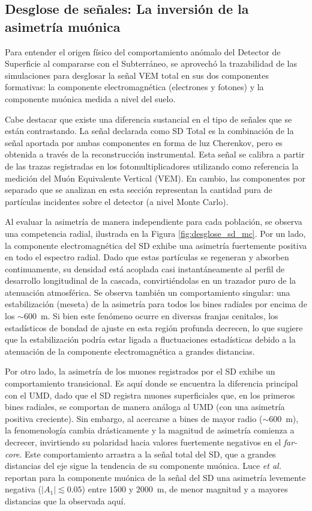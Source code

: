 \subsection{Desglose de señales: La inversión de la asimetría muónica}
\label{subsubsec:desglose_sd}

Para entender el origen físico del comportamiento anómalo del Detector de Superficie al compararse con el Subterráneo, se aprovechó la trazabilidad de las simulaciones para desglosar la señal VEM total en sus dos componentes formativas: la componente electromagnética (electrones y fotones) y la componente muónica medida a nivel del suelo. 

Cabe destacar que existe una diferencia sustancial en el tipo de señales que se están contrastando. La señal declarada como SD Total es la combinación de la señal aportada por ambas componentes en forma de luz Cherenkov, pero es obtenida a través de la reconstrucción instrumental. Esta señal se calibra a partir de las trazas registradas en los fotomultiplicadores utilizando como referencia la medición del Muón Equivalente Vertical (VEM). En cambio, las componentes por separado que se analizan en esta sección representan la cantidad pura de partículas incidentes sobre el detector (a nivel Monte Carlo). 

Al evaluar la asimetría de manera independiente para cada población, se observa una competencia radial, ilustrada en la Figura \ref{fig:desglose_sd_mc}. Por un lado, la componente electromagnética del SD exhibe una asimetría fuertemente positiva en todo el espectro radial. Dado que estas partículas se regeneran y absorben continuamente, su densidad está acoplada casi instantáneamente al perfil de desarrollo longitudinal de la cascada, convirtiéndolas en un trazador puro de la atenuación atmosférica. Se observa también un comportamiento singular: una estabilización (meseta) de la asimetría para todos los bines radiales por encima de los $\sim 600$~m. Si bien este fenómeno ocurre en diversas franjas cenitales, los estadísticos de bondad de ajuste en esta región profunda decrecen, lo que sugiere que la estabilización podría estar ligada a fluctuaciones estadísticas debido a la atenuación de la componente electromagnética a grandes distancias.

Por otro lado, la asimetría de los muones registrados por el SD exhibe un comportamiento transicional. Es aquí donde se encuentra la diferencia principal con el UMD, dado que el SD registra muones superficiales que, en los primeros bines radiales, se comportan de manera análoga al UMD (con una asimetría positiva creciente). Sin embargo, al acercarse a bines de mayor radio ($\sim 600$~m), la fenomenología cambia drásticamente y la magnitud de asimetría comienza a decrecer, invirtiendo su polaridad hacia valores fuertemente negativos en el \textit{far-core}. Este comportamiento arrastra a la señal total del SD, que a grandes distancias del eje sigue la tendencia de su componente muónica. Luce \textit{et al.} \cite{Luce_ICRC2021} reportan para la componente muónica de la señal del SD una asimetría levemente negativa ($|A_1| \lesssim 0.05$) entre $1500$ y $2000$~m, de menor magnitud y a mayores distancias que la observada aquí.

